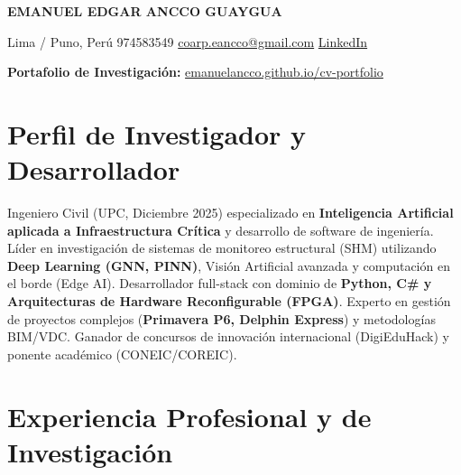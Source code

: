 \documentclass[10pt, a4paper]{article}
\begin{document}
\begin{center}
    {\Huge\bfseries EMANUEL EDGAR ANCCO GUAYGUA}
    \vspace{2mm}

    \faMapMarker*{} Lima / Puno, Perú \quad
    \faPhone*{} 974583549 \quad
    \faEnvelope{} \href{mailto:coarp.eancco@gmail.com}{coarp.eancco@gmail.com} \quad
    \faLinkedin{} \href{https://www.linkedin.com/in/emanuel-edgar-ancco-guaygua-a61210352}{LinkedIn}
    
    \faGlobe{} \textbf{Portafolio de Investigación:} \href{https://emanuelancco.github.io/cv-portfolio/}{emanuelancco.github.io/cv-portfolio}
\end{center}

\vspace{2mm}

\section*{Perfil de Investigador y Desarrollador}
Ingeniero Civil (UPC, Diciembre 2025) especializado en \textbf{Inteligencia Artificial aplicada a Infraestructura Crítica} y desarrollo de software de ingeniería. Líder en investigación de sistemas de monitoreo estructural (SHM) utilizando \textbf{Deep Learning (GNN, PINN)}, Visión Artificial avanzada y computación en el borde (Edge AI). Desarrollador full-stack con dominio de \textbf{Python, C\# y Arquitecturas de Hardware Reconfigurable (FPGA)}. Experto en gestión de proyectos complejos (\textbf{Primavera P6, Delphin Express}) y metodologías BIM/VDC. Ganador de concursos de innovación internacional (DigiEduHack) y ponente académico (CONEIC/COREIC).

\vspace{2mm}
\begin{center}
\end{center}

\vspace{3mm}

\section*{Experiencia Profesional y de Investigación}
\end{document}
